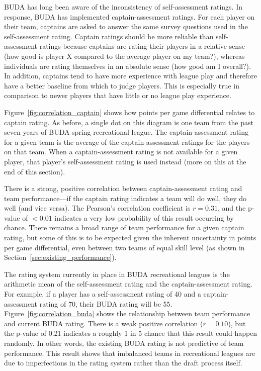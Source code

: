 BUDA has long been aware of the inconsistency of self-assessment ratings.  In response, BUDA has implemented captain-assessment ratings.  For each player on their team, captains are asked to answer the same survey questions used in the self-assessment rating.  Captain ratings should be more reliable than self-assessment ratings because captains are rating their players in a relative sense (how good is player X compared to the average player on my team?), whereas individuals are rating themselves in an absolute sense (how good am I overall?). In addition, captains tend to have more experience with league play and therefore have a better baseline from which to judge players. This is especially true in comparison to newer players that have little or no league play experience.

Figure~\ref{fig:correlation_captain} shows how points per game differential relates to captain rating.  As before, a single dot on this diagram is one team from the past seven years of BUDA spring recreational league.  The captain-assessment rating for a given team is the average of the captain-assessment ratings for the players on that team. When a captain-assessment rating is not available for a given player, that player's self-assessment rating is used instead (more on this at the end of this section).

There is a strong, positive correlation between captain-assessment rating and team performance---if the captain rating indicates a team will do well, they do well (and vice versa). The Pearson's correlation coefficient is $r = 0.31$, and the p-value of $<0.01$ indicates a very low probability of this result occurring by chance. There remains a broad range of team performance for a given captain rating, but some of this is to be expected given the inherent uncertainty in points per game differential, even between two teams of equal skill level (as shown in Section~\ref{sec:existing_performance}).

The rating system currently in place in BUDA recreational leagues is the arithmetic mean of the self-assessment rating and the captain-assessment rating.  For example, if a player has a self-assessment rating of 40 and a captain-assessment rating of 70, their BUDA rating will be 55. Figure~\ref{fig:correlation_buda} shows the relationship between team performance and current BUDA rating. There is a weak positive correlation ($r = 0.10$), but the p-value of 0.21 indicates a roughly 1 in 5 chance that this result could happen randomly.  In other words, the existing BUDA rating is not predictive of team performance. This result shows that imbalanced teams in recreational leagues are due to imperfections in the rating system rather than the draft process itself.

